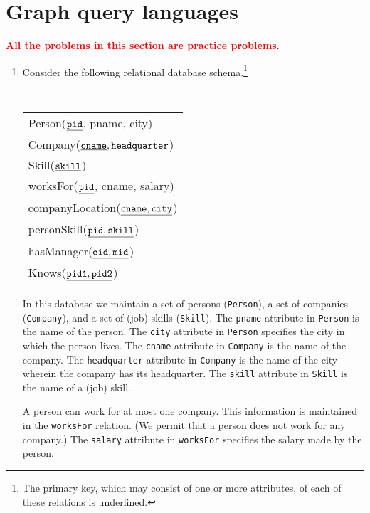 \documentclass[10pt]{article}
\begin{document}
\newpage
\section{Graph query languages}

\textcolor{red}{\bf All the problems in this section are practice problems}.

\bigskip

\begin{enumerate}[resume]
\item Consider the following relational database schema.\footnote{The primary key, which may consist of one or more attributes, of each of these relations is underlined.}

\begin{center}
{\tt
  \begin{tabular}{l}
  {Person}($\underline{\tt pid}$, pname, city) \\
  {Company}($\underline{\tt cname}, {\tt headquarter}$) \\
  {Skill}($\underline{\tt skill}$) \\
  {worksFor}($\underline{\tt pid}$, cname, salary) \\
  {companyLocation}($\underline{\tt cname, city}$) \\
  {personSkill}($\underline{\tt pid, skill}$) \\
  {hasManager}($\underline{\tt eid, mid}$) \\
  {Knows}($\underline{\tt pid1, pid2}$) \\
   \end{tabular}
  }
\end{center}

In this database we maintain a set of persons ({\tt Person}), a set
of companies ({\tt Company}), and a set of (job) skills ({\tt Skill}).  
The {\tt pname} attribute in {\tt Person} is the name of the person.  
The {\tt city} attribute in {\tt Person} specifies the city in which the person lives.  
The {\tt cname} attribute in {\tt Company} is the name of the company.
The {\tt headquarter} attribute in {\tt Company} is the name of the city wherein the company has its headquarter.
The {\tt skill} attribute in {\tt Skill} is the name of a (job) skill.

A person can work for at most one company. This information is maintained in the {\tt worksFor} relation. (We permit that a person does not work for any company.)
The {\tt salary} attribute in {\tt worksFor} specifies the salary made by the person.


\end{enumerate}
\end{document}
